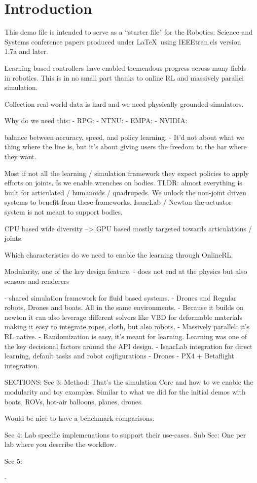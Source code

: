 \section{Introduction}
This demo file is intended to serve as a ``starter file" for the Robotics: Science and Systems conference papers produced under \LaTeX\ using IEEEtran.cls version 1.7a and later.

Learning based controllers have enabled tremendous progress across many fields in robotics.
This is in no small part thanks to online RL and massively parallel simulation.


Collection real-world data is hard and we need physically grounded simulators.

Why do we need this:
- RPG: 
- NTNU: 
- EMPA: 
- NVIDIA: 

balance between accuracy, speed, and policy learning.
- It'd not about what we thing where the line is, but it's about giving users the freedom to the bar where they want. 

Most if not all the learning / simulation framework they expect policies to apply efforts on joints.
Is we enable wrenches on bodies.
TLDR: almost everything is built for articulated / humanoids / quadrupeds.
We unlock the non-joint driven systems to benefit from these frameworks.
IsaacLab / Newton the actuator system is not meant to support bodies.

CPU based wide diversity --> GPU based mostly targeted towards articulations / joints.


Which characteristics do we need to enable the learning through OnlineRL.

Modularity, one of the key design feature.
- does not end at the physics but also sensors and renderers

- shared simulation framework for fluid based systems.
  - Drones and Regular robots, Drones and boats.
All in the same environments.
  - Because it builds on newton it can also leverage different solvers like VBD for deformable materials making it easy to integrate ropes, cloth, but also robots. 
- Massively parallel: it's 
RL native.
   - Randomization is easy, it's meant for learning.
Learning was one of the key decisional factors around the API design.
   - IsaacLab integration for direct learning, default tasks and robot cojfigurations
- Drones
    - PX4 + Betaflight integration. 



SECTIONS: Sec 3: Method: That's the simulation Core and how to we enable the modularity and toy examples.
Similar to what we did for the initial demos with boats, ROVs, hot-air balloons, planes, drones.

Would be nice to have a benchmark comparisons.

Sec 4: Lab specific implemenations to support their use-cases.
Sub Sec: One per lab where you describe the workflow.

Sec 5:




- 

